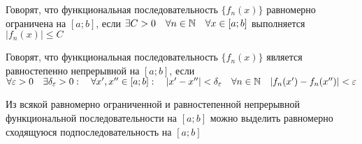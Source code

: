\begin{definition}
    Говорят, что функциональная последовательность $\{ f_n(x) \}$ равномерно
    ограничена на $[a; b]$, если $\exists C > 0 \quad \forall n \in \mathbb{N} \quad
    \forall x \in [a; b]$ выполняется $|f_n(x)| \leq C$
\end{definition}

\begin{definition}
    Говорят, что функциональная последовательность $\{ f_n(x) \}$ является
    равностепенно непрерывной на $[a; b]$, если $\forall \varepsilon > 0 \quad
    \exists \delta_\varepsilon > 0: \quad \forall x', x'' \in [a; b]: \quad
    |x' - x''| < \delta_\varepsilon \quad \forall n \in \mathbb{N} \quad
    |f_n(x') - f_n(x'')| < \varepsilon$
\end{definition}

\begin{theorem}[Арцела]
    Из всякой равномерно ограниченной и равностепенной непрерывной
    функциональной последовательности на $[a; b]$ можно выделить
    равномерно сходящуюся подпоследовательность на $[a; b]$
\end{theorem}
